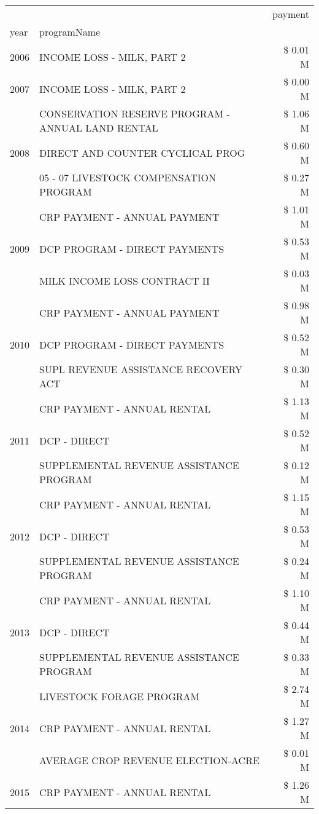 \begin{tabular}{llr}
\toprule
 &  & payment \\
year & programName &  \\
\midrule
2006 & INCOME LOSS - MILK, PART 2 & \$ 0.01 M \\
\cline{1-3}
2007 & INCOME LOSS - MILK, PART 2 & \$ 0.00 M \\
\cline{1-3}
\multirow[t]{3}{*}{2008} & CONSERVATION RESERVE PROGRAM - ANNUAL LAND RENTAL & \$ 1.06 M \\
 & DIRECT AND COUNTER CYCLICAL PROG & \$ 0.60 M \\
 & 05 - 07 LIVESTOCK COMPENSATION PROGRAM & \$ 0.27 M \\
\cline{1-3}
\multirow[t]{3}{*}{2009} & CRP PAYMENT - ANNUAL PAYMENT & \$ 1.01 M \\
 & DCP PROGRAM - DIRECT PAYMENTS & \$ 0.53 M \\
 & MILK INCOME LOSS CONTRACT II & \$ 0.03 M \\
\cline{1-3}
\multirow[t]{3}{*}{2010} & CRP PAYMENT - ANNUAL PAYMENT & \$ 0.98 M \\
 & DCP PROGRAM - DIRECT PAYMENTS & \$ 0.52 M \\
 & SUPL REVENUE ASSISTANCE RECOVERY ACT & \$ 0.30 M \\
\cline{1-3}
\multirow[t]{3}{*}{2011} & CRP PAYMENT - ANNUAL RENTAL & \$ 1.13 M \\
 & DCP - DIRECT & \$ 0.52 M \\
 & SUPPLEMENTAL REVENUE ASSISTANCE PROGRAM & \$ 0.12 M \\
\cline{1-3}
\multirow[t]{3}{*}{2012} & CRP PAYMENT - ANNUAL RENTAL & \$ 1.15 M \\
 & DCP - DIRECT & \$ 0.53 M \\
 & SUPPLEMENTAL REVENUE ASSISTANCE PROGRAM & \$ 0.24 M \\
\cline{1-3}
\multirow[t]{3}{*}{2013} & CRP PAYMENT - ANNUAL RENTAL & \$ 1.10 M \\
 & DCP - DIRECT & \$ 0.44 M \\
 & SUPPLEMENTAL REVENUE ASSISTANCE PROGRAM & \$ 0.33 M \\
\cline{1-3}
\multirow[t]{3}{*}{2014} & LIVESTOCK FORAGE PROGRAM & \$ 2.74 M \\
 & CRP PAYMENT - ANNUAL RENTAL & \$ 1.27 M \\
 & AVERAGE CROP REVENUE ELECTION-ACRE & \$ 0.01 M \\
\cline{1-3}
\multirow[t]{3}{*}{2015} & CRP PAYMENT - ANNUAL RENTAL & \$ 1.26 M \\

\end{tabular}
